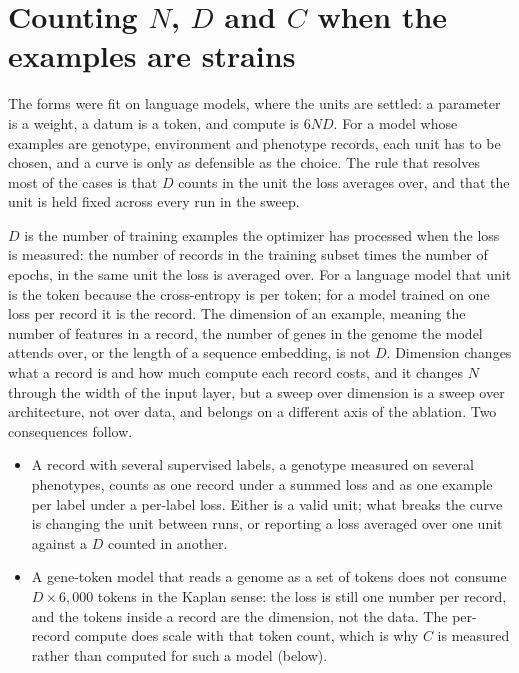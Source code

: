 
\section{Counting $N$, $D$ and $C$ when the examples are strains}
\label{sec:counting}

The forms were fit on language models, where the units are settled: a parameter
is a weight, a datum is a token, and compute is $6ND$. For a model whose examples
are genotype, environment and phenotype records, each unit has to be chosen, and a
curve is only as defensible as the choice. The rule that resolves most of the
cases is that $D$ counts in the unit the loss averages over, and that the unit is
held fixed across every run in the sweep.

$D$ is the number of training examples the optimizer has processed when the loss is
measured: the number of records in the training subset times the number of
epochs, in the same unit the loss is averaged over. For a language model that unit
is the token because the cross-entropy is per token; for a model trained on one
loss per record it is the record. The dimension of an example, meaning the number
of features in a record, the number of genes in the genome the model attends over,
or the length of a sequence embedding, is not $D$. Dimension changes what a record
is and how much compute each record costs, and it changes $N$ through the width of
the input layer, but a sweep over dimension is a sweep over architecture, not over
data, and belongs on a different axis of the ablation. Two consequences follow.

\begin{itemize}
\item A record with several supervised labels, a genotype measured on several
phenotypes, counts as one record under a summed loss and as one example per label
under a per-label loss. Either is a valid unit; what breaks the curve is changing
the unit between runs, or reporting a loss averaged over one unit against a $D$
counted in another.
\item A gene-token model that reads a genome as a set of tokens does not consume
$D \times 6{,}000$ tokens in the Kaplan sense: the loss is still one number per
record, and the tokens inside a record are the dimension, not the data. The
per-record compute does scale with that token count, which is why $C$ is measured
rather than computed for such a model (below).
\end{itemize}

